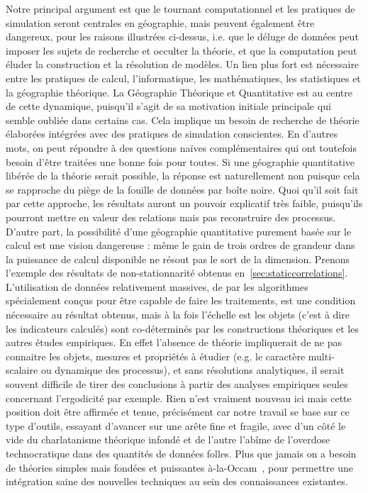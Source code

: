 {Notre principal argument est que le tournant computationnel et les pratiques de simulation seront centrales en géographie, mais peuvent également être dangereux, pour les raisons illustrées ci-dessus, i.e. que le déluge de données peut imposer les sujets de recherche et occulter la théorie, et que la computation peut éluder la construction et la résolution de modèles. Un lien plus fort est nécessaire entre les pratiques de calcul, l'informatique, les mathématiques, les statistiques et la géographie théorique. La Géographie Théorique et Quantitative est au centre de cette dynamique, puisqu'il s'agit de sa motivation initiale principale qui semble oubliée dans certains cas. Cela implique un besoin de recherche de théorie élaborées intégrées avec des pratiques de simulation conscientes. En d'autres mots, on peut répondre à des questions naïves complémentaires qui ont toutefois besoin d'être traitées une bonne fois pour toutes. Si une géographie quantitative libérée de la théorie serait possible, la réponse est naturellement non puisque cela se rapproche du piège de la fouille de données par boîte noire. Quoi qu'il soit fait par cette approche, les résultats auront un pouvoir explicatif très faible, puisqu'ils pourront mettre en valeur des relations mais pas reconstruire des processus. D'autre part, la possibilité d'une géographie quantitative purement basée sur le calcul est une vision dangereuse : même le gain de trois ordres de grandeur dans la puissance de calcul disponible ne résout pas le sort de la dimension. Prenons l'exemple des résultats de non-stationnarité obtenus en~\ref{sec:staticcorrelations}. L'utilisation de données relativement massives, de par les algorithmes spécialement conçus pour être capable de faire les traitements, est une condition nécessaire au résultat obtenus, mais à la fois l'échelle est les objets (c'est à dire les indicateurs calculés) sont co-déterminés par les constructions théoriques et les autres études empiriques. En effet l'absence de théorie impliquerait de ne pas connaitre les objets, mesures et propriétés à étudier (e.g. le caractère multi-scalaire ou dynamique des processus), et sans résolutions analytiques, il serait souvent difficile de tirer des conclusions à partir des analyses empiriques seules concernant l'ergodicité par exemple. Rien n'est vraiment nouveau ici mais cette position doit être affirmée et tenue, précisément car notre travail se base sur ce type d'outils, essayant d'avancer sur une arête fine et fragile, avec d'un côté le vide du charlatanisme théorique infondé et de l'autre l'abîme de l'overdose technocratique dans des quantités de données folles. Plus que jamais on a besoin de théories simples mais fondées et puissantes {\`a}-la-Occam~\cite{batty2016theoretical}, pour permettre une intégration saine des nouvelles techniques au sein des connaissances existantes.
}






